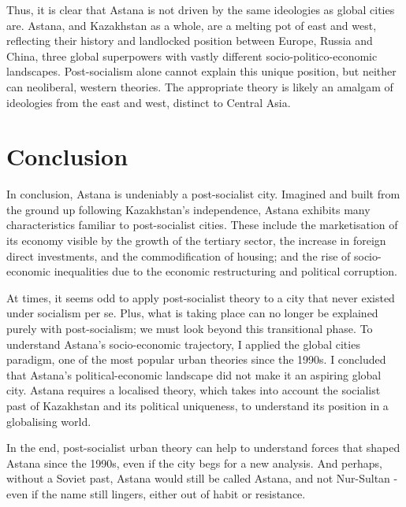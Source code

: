 \documentclass{article}
\begin{document}
Thus, it is clear that Astana is not driven by the same ideologies as global cities are. Astana, and Kazakhstan as a whole, are a melting pot of east and west, reflecting their history and landlocked position between Europe, Russia and China, three global superpowers with vastly different socio-politico-economic landscapes. Post-socialism alone cannot explain this unique position, but neither can neoliberal, western theories. The appropriate theory is likely an amalgam of ideologies from the east and west, distinct to Central Asia.

\section{Conclusion}

In conclusion, Astana is undeniably a post-socialist city. Imagined and built from the ground up following Kazakhstan's independence, Astana exhibits many characteristics familiar to post-socialist cities. These include the marketisation of its economy visible by the growth of the tertiary sector, the increase in foreign direct investments, and the commodification of housing; and the rise of socio-economic inequalities due to the economic restructuring and political corruption.

At times, it seems odd to apply post-socialist theory to a city that never existed under socialism per se. Plus, what is taking place can no longer be explained purely with post-socialism; we must look beyond this transitional phase.
To understand Astana's socio-economic trajectory, I applied the global cities paradigm, one of the most popular urban theories since the 1990s. I concluded that Astana's political-economic landscape did not make it an aspiring global city.
 Astana requires a localised theory, which takes into account the socialist past of Kazakhstan and its political uniqueness, to understand its position in a globalising world.


In the end, post-socialist urban theory can help to understand forces that shaped Astana since the 1990s, even if the city begs for a new analysis.
And perhaps, without a Soviet past, Astana would still be called Astana, and not Nur-Sultan - even if the name still lingers, either out of habit or resistance.

\end{document}
